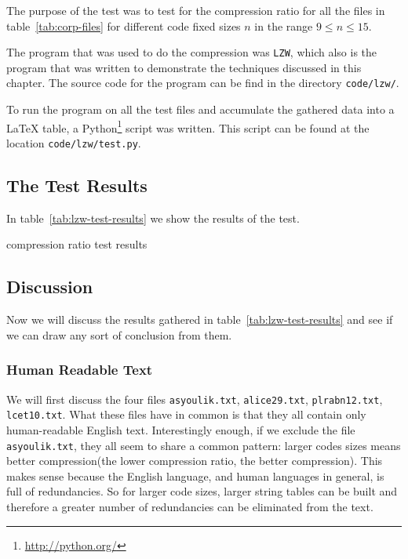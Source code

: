 The purpose of the test was to test for the compression ratio for all
the files in table~\ref{tab:corp-files} for different code fixed sizes
$n$ in the range $9 \leq n \leq 15$.

The program that was used to do the compression was \verb|LZW|, which
also is the program that was written to demonstrate the techniques
discussed in this chapter. The source code for the program can be find
in the directory \verb|code/lzw/|.

To run the program on all the test files and accumulate the gathered
data into a \LaTeX{} table, a
Python\footnote{\url{http://python.org/}} script was written. This
script can be found at the location \verb|code/lzw/test.py|.

\subsection{The Test Results}

In table~\ref{tab:lzw-test-results} we show the results of the test.

\begin{sidewaystable}
    \small
    \centering
    
    \caption{\lzw compression ratio test results}
    \label{tab:lzw-test-results}
\end{sidewaystable}
\subsection{Discussion}

Now we will discuss the results gathered in
table~\ref{tab:lzw-test-results} and see if we can draw any sort of
conclusion from them.

\subsubsection{Human Readable Text}

We will first discuss the four files \verb|asyoulik.txt|,
\verb|alice29.txt|, \verb|plrabn12.txt|, \verb|lcet10.txt|. What these
files have in common is that they all contain only human-readable
English text. Interestingly enough, if we exclude the file
\verb|asyoulik.txt|, they all seem to share a common pattern: larger
codes sizes means better compression(the lower compression ratio, the
better compression). This makes sense because the English language,
and human languages in general, is full of redundancies. So for larger
code sizes, larger string tables can be built and therefore a greater
number of redundancies can be eliminated from the text.


